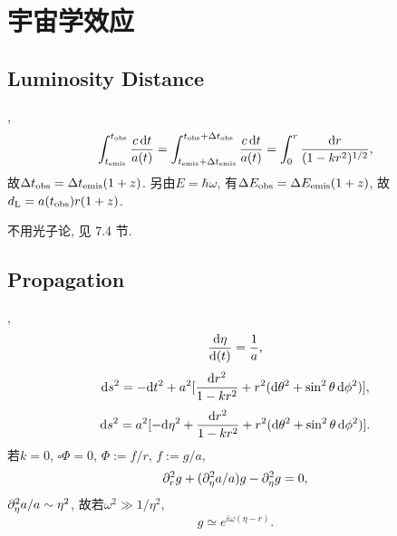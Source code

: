 \chapter{宇宙学效应}

\section{Luminosity Distance}

\cite{Maggiore2014},
\begin{equation}
    \int_{t_\text{emis}}^{t_\text{obs}}\frac{c\,\mathrm{d} t}{a(t)}=    \int_{t_\text{emis}+\Delta t_\text{emis}}^{t_\text{obs}+\Delta t_\text{obs}}\frac{c\,\mathrm{d} t}{a(t)}=\int_0^r\frac{\mathrm{d} r}{(1-kr^2)^{1/2}},
\end{equation}
故$\Delta t_\text{obs}=\Delta t_\text{emis}(1+z)$. 另由$E=\hbar\omega$, 有$\Delta E_\text{obs}=\Delta E_\text{emis}(1+z)$, 故$d_\text{L}=a(t_\text{obs})r(1+z)$.

不用光子论, 见\cite{Ellis2012} 7.4 节.

\section{Propagation}

\cite{Maggiore2014},
\begin{equation}
    \frac{\mathrm{d}\eta}{\mathrm{d}(t)}=\frac{1}{a},
\end{equation}
\begin{equation}
    \mathrm{d} s^2=-\mathrm{d} t^2+a^2[\frac{\mathrm{d} r^2}{1-kr^2}+r^2(\mathrm{d}\theta^2+\sin^2\theta\,\mathrm{d}\phi^2)],
\end{equation}
\begin{equation}
    \mathrm{d} s^2=a^2[-\mathrm{d}\eta^2+\frac{\mathrm{d} r^2}{1-kr^2}+r^2(\mathrm{d}\theta^2+\sin^2\theta\,\mathrm{d}\phi^2)].
\end{equation}
若$k=0$, $\square\Phi=0$, $\Phi:=f/r$, $f:=g/a$,
\begin{equation}
    \partial_r^2g+(\partial_\eta^2a/a)g-\partial_\eta^2g=0,
\end{equation}
$\partial_\eta^2a/a\sim\eta^2$, 故若$\omega^2\gg1/\eta^2$,
\begin{equation}
    g\simeq e^{i\omega(\eta-r)}.
\end{equation}
